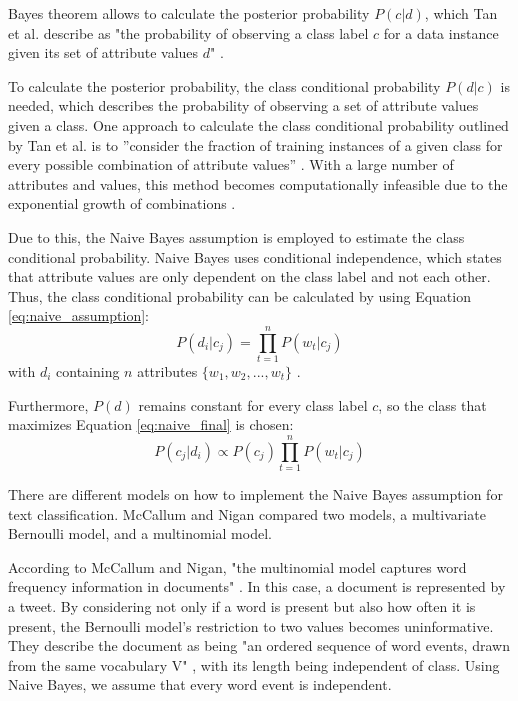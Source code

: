 
        Bayes theorem allows to calculate the posterior probability $P(c|d)$, which Tan et al. describe as "the probability of observing a class label $c$ for a data instance given its set of attribute values $d$" \cite[p.~418]{DBLP:books/aw/TanSKK2019}. 

        To calculate the posterior probability, the class conditional probability $P(d|c)$ is needed, which describes the probability of observing a set of attribute values given a class. One approach to calculate the class conditional probability outlined by Tan et al. is to ''consider the fraction of training instances of a given class for every possible combination of attribute values'' \cite[p.~419]{DBLP:books/aw/TanSKK2019}. With a large number of attributes and values, this method becomes computationally infeasible due to the exponential growth of combinations \cite{DBLP:books/aw/TanSKK2019}.

        Due to this, the Naive Bayes assumption is employed to estimate the class conditional probability. Naive Bayes uses conditional independence, which states that attribute values are only dependent on the class label and not each other. Thus, the class conditional probability can be calculated by using Equation \eqref{eq:naive_assumption}:
        \begin{equation}
            \label{eq:naive_assumption}
            P(d_i|c_j) = \prod_{t=1}^{n}P(w_{t}|c_j)
        \end{equation}
        with $d_i$ containing $n$ attributes $\{w_1,w_2,...,w_t\}$ \cite{DBLP:books/aw/TanSKK2019}.

        Furthermore, $P(d)$ remains constant for every class label $c$, so the class that maximizes Equation \eqref{eq:naive_final} is chosen: 
        \begin{equation}
            \label{eq:naive_final}
            P(c_j|d_i)\propto P(c_j)\prod_{t=1}^{n}P(w_{t}|c_j) 
        \end{equation}   
        
        
        There are different models on how to implement the Naive Bayes assumption for text classification. McCallum and Nigan compared two models, a multivariate Bernoulli model, and a multinomial model. 
        
        According to McCallum and Nigan, "the multinomial model captures word frequency information in documents" \cite[p.~3]{Mccallum1998}. In this case, a document is represented by a tweet. By considering not only if a word is present but also how often it is present, the Bernoulli model's restriction to two values becomes uninformative. They describe the document as being "an ordered sequence of word events, drawn from the same vocabulary V" \cite[p.~3]{Mccallum1998}, with its length being independent of class. Using Naive Bayes, we assume that every word event is independent.
        
